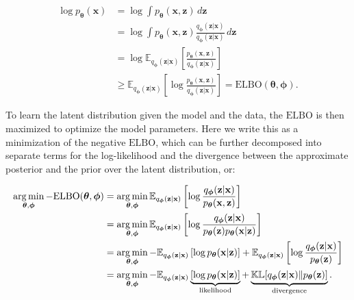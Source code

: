 \begin{subequations}
\begin{align}
    \log p_{\boldsymbol{\theta}}(\mathbf{x}) &= \log \int p_{\boldsymbol{\theta}}(\mathbf{x}, \mathbf{z}) \, d\mathbf{z} \\
    &= \log \int p_{\boldsymbol{\theta}}(\mathbf{x}, \mathbf{z}) \frac{q_{\boldsymbol{\phi}}(\mathbf{z} | \mathbf{x})}{q_{\boldsymbol{\phi}}(\mathbf{z} | \mathbf{x})} \, d\mathbf{z} \\
    &= \log \mathbb{E}_{q_{\boldsymbol{\phi}}(\mathbf{z} | \mathbf{x})}\left[\frac{p_{\boldsymbol{\theta}}(\mathbf{x}, \mathbf{z})}{q_{\boldsymbol{\phi}}(\mathbf{z} | \mathbf{x})}\right] \\
    &\geq \mathbb{E}_{    q_{\boldsymbol{\phi}}(\mathbf{z} | \mathbf{x})}\left[\log\frac{p_{\boldsymbol{\theta}}(\mathbf{x}, \mathbf{z})}{q_{\boldsymbol{\phi}}(\mathbf{z} | \mathbf{x})}\right] = \mathrm{ELBO}(\boldsymbol{\theta}, \boldsymbol{\phi}).
\end{align}
\end{subequations}

To learn the latent distribution given the model and the data, the $\mathrm{ELBO}$ is then maximized to optimize the model parameters. Here we write this as a minimization of the negative $\mathrm{ELBO}$, which can be further decomposed into separate terms for the log-likelihood and the divergence between the approximate posterior and the prior over the latent distribution, or:

\begin{subequations}
\begin{align}
    \operatorname*{arg\,min}_{\boldsymbol{\theta}, \boldsymbol{\phi}}-\mathrm{ELBO}(\boldsymbol{\theta}, \boldsymbol{\phi}) &= \operatorname*{arg\,min}_{\boldsymbol{\theta}, \boldsymbol{\phi}} \mathbb{E}_{    q_{\boldsymbol{\phi}}(\mathbf{z} | \mathbf{x})}\left[ \log\frac{q_{\boldsymbol{\phi}}(\mathbf{z} | \mathbf{x})}{p_{\boldsymbol{\theta}}(\mathbf{x}, \mathbf{z})}\right] \\
    &= \operatorname*{arg\,min}_{\boldsymbol{\theta}, \boldsymbol{\phi}} \mathbb{E}_{    q_{\boldsymbol{\phi}}(\mathbf{z} | \mathbf{x})}\left[ \log\frac{q_{\boldsymbol{\phi}}(\mathbf{z} | \mathbf{x})}{p_{\boldsymbol{\theta}}(\mathbf{z})p_{\boldsymbol{\theta}}(\mathbf{x} | \mathbf{z})}\right] \\ 
    &= \operatorname*{arg\,min}_{\boldsymbol{\theta}, \boldsymbol{\phi}} -\mathbb{E}_{    q_{\boldsymbol{\phi}}(\mathbf{z} | \mathbf{x})}\left[ \log p_{\boldsymbol{\theta}}(\mathbf{x} | \mathbf{z})\right] + \mathbb{E}_{    q_{\boldsymbol{\phi}}(\mathbf{z} | \mathbf{x})}\left[ \log\frac{q_{\boldsymbol{\phi}}(\mathbf{z} | \mathbf{x})}{p_{\boldsymbol{\theta}}(\mathbf{z})}\right] \label{eq:expected_elbo}\\
    &= \operatorname*{arg\,min}_{\boldsymbol{\theta}, \boldsymbol{\phi}} -\mathbb{E}_{q_{\boldsymbol{\phi}}(\mathbf{z} | \mathbf{x})}\underbrace{\left[\log p_{\boldsymbol{\theta}}(\mathbf{x} | \mathbf{z})\right]}_{\textrm{likelihood}} + \underbrace{\mathbb{KL}[q_{\boldsymbol{\phi}}(\mathbf{z} | \mathbf{x}) \| p_{\boldsymbol{\theta}}(\mathbf{z})]}_{\textrm{divergence}}. \label{eq:elbo_2}
\end{align}
\end{subequations}

